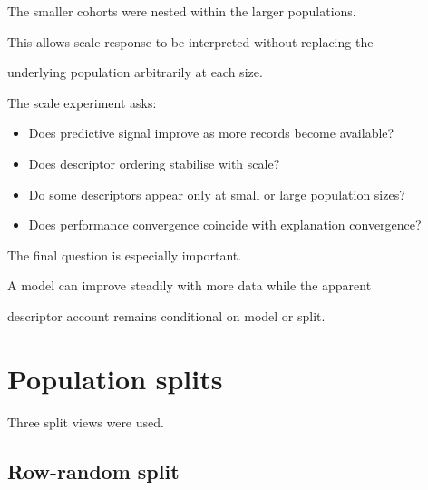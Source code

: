 \documentclass[11pt,a4paper,oneside]{report}
\begin{document}
The smaller cohorts were nested within the larger populations.



This allows scale response to be interpreted without replacing the

underlying population arbitrarily at each size.



The scale experiment asks:



\begin{itemize}



\item

Does predictive signal improve as more records become available?



\item

Does descriptor ordering stabilise with scale?



\item

Do some descriptors appear only at small or large population sizes?



\item

Does performance convergence coincide with explanation convergence?



\end{itemize}



The final question is especially important.



A model can improve steadily with more data while the apparent

descriptor account remains conditional on model or split.





\section{Population splits}



Three split views were used.



\subsection{Row-random split}
\end{document}
